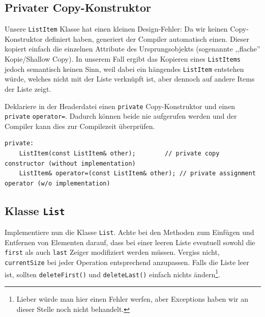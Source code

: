 \subsection{Privater Copy-Konstruktor}
Unsere \texttt{ListItem} Klasse hat einen kleinen Design-Fehler:
Da wir keinen Copy-Konstruktor definiert haben, generiert der Compiler automatisch einen.
Dieser kopiert einfach die einzelnen Attribute des Ursprungsobjekts (sogenannte ,,flache'' Kopie/Shallow Copy).
In unserem Fall ergibt das Kopieren eines \texttt{ListItems} jedoch semantisch keinen Sinn, weil dabei ein hängendes \texttt{ListItem} entstehen würde, welches nicht mit der Liste verknüpft ist, aber dennoch auf andere Items der Liste zeigt.

Deklariere in der Headerdatei einen \texttt{private} Copy-Konstruktor und einen \texttt{private} \texttt{operator=}.
Dadurch können beide nie aufgerufen werden und der Compiler kann dies zur Compilezeit überprüfen.

\begin{lstlisting}
private:
	ListItem(const ListItem& other);		// private copy constructor (without implementation)
	ListItem& operator=(const ListItem& other);	// private assignment operator (w/o implementation)
\end{lstlisting}


\subsection{Klasse \texttt{List}}
Implementiere nun die Klasse \texttt{List}.
Achte bei den Methoden zum Einfügen und Entfernen von Elementen darauf, dass bei einer leeren Liste eventuell sowohl die \texttt{first} als auch \texttt{last} Zeiger modifiziert werden müssen.
Vergiss nicht, \texttt{currentSize} bei jeder Operation entsprechend anzupassen.
Falls die Liste leer ist, sollten \texttt{deleteFirst()} und \texttt{deleteLast()} einfach nichts ändern\footnote{Lieber würde man hier einen Fehler werfen, aber Exceptions haben wir an dieser Stelle noch nicht behandelt.}.

